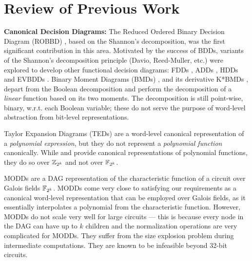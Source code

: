 \section{Review of Previous Work}
\label{sec:prev}

{\bf Canonical Decision Diagrams:} 
The Reduced Ordered Binary Decision Diagram
(ROBBD) \cite{BRYA86}, based on the Shannon's decomposition, was the
first significant contribution in this area. 
Motivated by the success of BDDs, 
variants of the Shannon's decomposition principle (Davio,
Reed-Muller, etc.) were explored to develop other functional decision
diagrams: FDDs \cite{okfdd}, ADDs \cite{add}, %
HDDs \cite{hdd} and EVBDDs \cite{evbdd}. 
Binary Moment Diagrams (BMDs) \cite{bmd}, and its derivative K*BMDs
\cite{kbmd}, %
depart from the Boolean
decomposition and perform the decomposition of a {\it linear} function
based on its two moments. The decomposition is still point-wise,
binary, w.r.t. each Boolean variable; these do not
serve the purpose of word-level abstraction from bit-level
representations. 

Taylor Expansion Diagrams (TEDs) \cite{ted_tcomp} are a word-level
canonical representation of a {\it polynomial expression}, but they do
not represent a {\it polynomial function} canonically. 
While \cite{shekhar:tcad07}  and \cite{alizadeh:tcad2010} provide
canonical representations of polynomial functions, they do so over
${\mathbb{Z}}_{2^k}$ and not over ${\mathbb{F}}_{2^k}$.


MODDs \cite{modd} \cite{modd_tcomp} are a DAG representation of the
characteristic function of a circuit over Galois fields ${\mathbb{F}}_{2^k}$. MODDs
come very close to satisfying our requirements as a canonical
word-level representation that can be employed over Galois fields, as
it essentially interpolates a polynomial from the characteristic 
function. However, MODDs do not scale very well for large circuits ---
this is because every node in the DAG can have up to $k$ children and
the normalization operations are very complicated for MODDs. They 
suffer from the size explosion problem during intermediate
computations. They are known to be infeasible beyond
32-bit circuits.  

